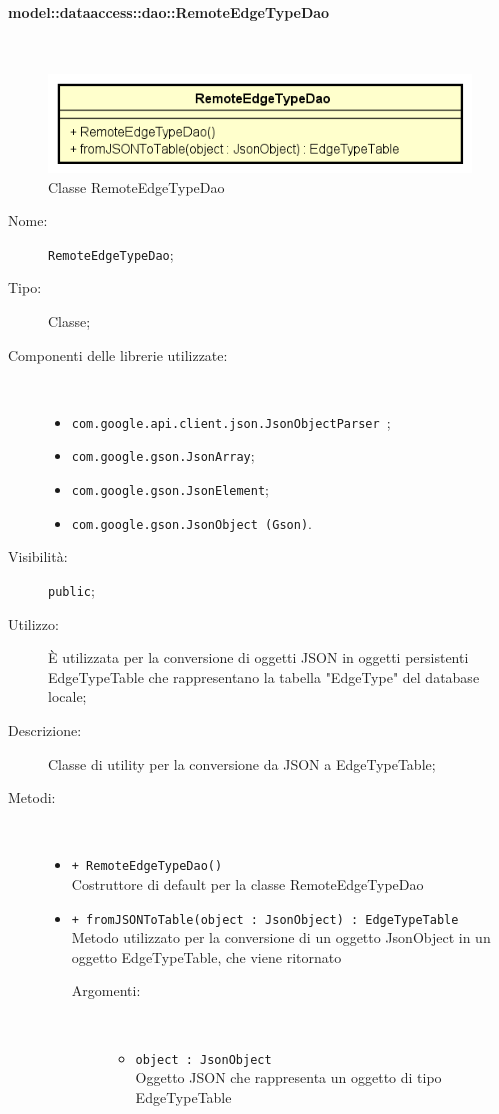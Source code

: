 \documentclass[../DefinizioneDiProdotto.tex]{subfiles}
\begin{document}
\paragraph{model::dataaccess::dao::RemoteEdgeTypeDao}
\
\begin{figure}[H]
	\centering
	\includegraphics[width=\maxwidth]{img/RemoteEdgeTypeDao.png}
	\caption{Classe RemoteEdgeTypeDao}\label{fig:model::dataaccess::dao::RemoteEdgeTypeDao} 
\end{figure}
\begin{description}
	\item[Nome:] \texttt{RemoteEdgeTypeDao};
	\item[Tipo:] Classe;
	\item[Componenti delle librerie utilizzate:] \
	\begin{itemize}
		\item \texttt{com.google.api.client.json.JsonObjectParser
		};
		
		\item \texttt{com.google.gson.JsonArray};
		
		\item \texttt{com.google.gson.JsonElement};
		
		\item \texttt{com.google.gson.JsonObject (Gson)}.
		
	\end{itemize}
	\item[Visibilità:] \texttt{public};
	\item[Utilizzo:] È utilizzata per la conversione di oggetti JSON in oggetti persistenti EdgeTypeTable che rappresentano la tabella "EdgeType" del database locale;
	\item[Descrizione:] Classe di utility per la conversione da JSON a EdgeTypeTable;
	\item[Metodi:] \
	\begin{itemize}
		\item \texttt{+ RemoteEdgeTypeDao()}\\
		Costruttore di default per la classe RemoteEdgeTypeDao
		\item \texttt{+ fromJSONToTable(object : JsonObject) : EdgeTypeTable}\\
		Metodo utilizzato per la conversione di un oggetto JsonObject in un oggetto EdgeTypeTable, che viene ritornato
		\begin{description}
			\item[Argomenti:] \
			\begin{itemize}
				\item \texttt{object : JsonObject}\\
				Oggetto JSON che rappresenta un oggetto di tipo EdgeTypeTable\end{itemize}
		\end{description}
	\end{itemize}
\end{description}
\end{document}
